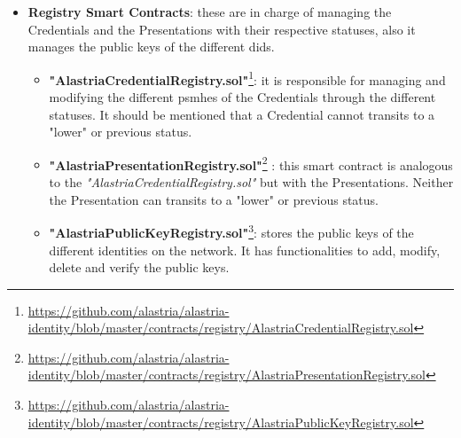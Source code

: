 \begin{itemize}
\begin{itemize}
                    \item \textbf{"AlastriaIdentityEntity.sol"}\footnote{\url{https://github.com/alastria/alastria-identity/blob/master/contracts/identityManager/AlastriaIdentityEntity.sol}}: it stores entity information, such as name, cif, logo \acrshort{url}, \acrshort{did}, \acrshort{url} of the Alastria Open Access and a flag to know if the entity is active or not.
                    \item \textbf{"AlastriaProxy.sol"}\footnote{\url{https://github.com/alastria/alastria-identity/blob/master/contracts/identityManager/AlastriaProxy.sol}}: this Contract, as its name indicates, acts as a proxy for the account \acrshort{eoa} that is carrying out the transaction. Since any call (except for a few) will always go through the account's proxy. It is responsible for emitting an event of what is being used.
                \end{itemize}
                \item \textbf{Registry Smart Contracts}: these are in charge of managing the Credentials and the Presentations with their respective statuses, also it manages the public keys of the different \acrshort{did}s.
                \begin{itemize}
                    \item \textbf{"AlastriaCredentialRegistry.sol"}\footnote{\url{https://github.com/alastria/alastria-identity/blob/master/contracts/registry/AlastriaCredentialRegistry.sol}}: it is responsible for managing and modifying the different \acrshort{psmh}es of the Credentials through the different statuses. It should be mentioned that a Credential cannot transits to a "lower" or previous status.
                    \item \textbf{"AlastriaPresentationRegistry.sol"}\footnote{\url{https://github.com/alastria/alastria-identity/blob/master/contracts/registry/AlastriaPresentationRegistry.sol}} : this smart contract is analogous to the \textit{"AlastriaCredentialRegistry.sol"} but with the Presentations. Neither the Presentation can transits to a "lower" or previous status.
                    \item \textbf{"AlastriaPublicKeyRegistry.sol"}\footnote{\url{https://github.com/alastria/alastria-identity/blob/master/contracts/registry/AlastriaPublicKeyRegistry.sol}}: stores the public keys of the different identities on the network. It has functionalities to add, modify, delete and verify the public keys.
                \end{itemize}

\end{itemize}
